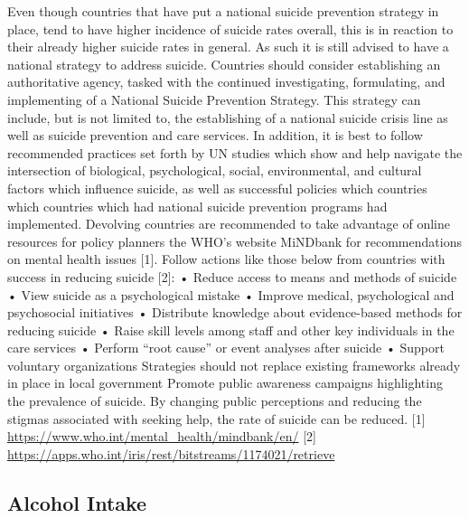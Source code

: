 \documentclass[]{article}
\begin{document}
Even though countries that have put a national suicide prevention
strategy in place, tend to have higher incidence of suicide rates
overall, this is in reaction to their already higher suicide rates in
general. As such it is still advised to have a national strategy to
address suicide. Countries should consider establishing an authoritative
agency, tasked with the continued investigating, formulating, and
implementing of a National Suicide Prevention Strategy. This strategy
can include, but is not limited to, the establishing of a national
suicide crisis line as well as suicide prevention and care services. In
addition, it is best to follow recommended practices set forth by UN
studies which show and help navigate the intersection of biological,
psychological, social, environmental, and cultural factors which
influence suicide, as well as successful policies which countries which
countries which had national suicide prevention programs had
implemented. Devolving countries are recommended to take advantage of
online resources for policy planners the WHO's website MiNDbank for
recommendations on mental health issues {[}1{]}. Follow actions like
those below from countries with success in reducing suicide {[}2{]}: •
Reduce access to means and methods of suicide • View suicide as a
psychological mistake • Improve medical, psychological and psychosocial
initiatives • Distribute knowledge about evidence-based methods for
reducing suicide • Raise skill levels among staff and other key
individuals in the care services • Perform ``root cause'' or event
analyses after suicide • Support voluntary organizations Strategies
should not replace existing frameworks already in place in local
government Promote public awareness campaigns highlighting the
prevalence of suicide. By changing public perceptions and reducing the
stigmas associated with seeking help, the rate of suicide can be
reduced. {[}1{]} \url{https://www.who.int/mental_health/mindbank/en/}
{[}2{]} \url{https://apps.who.int/iris/rest/bitstreams/1174021/retrieve}

\subsection{Alcohol Intake}\label{alcohol-intake-1}
\end{document}
